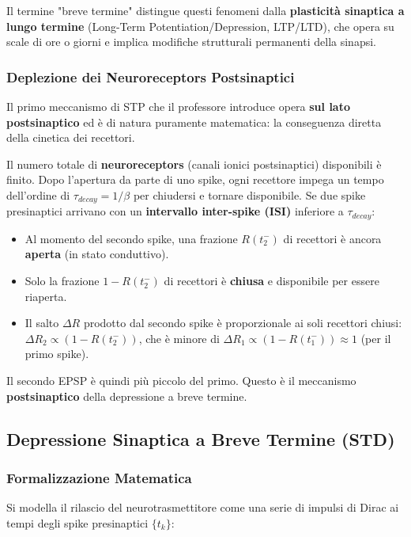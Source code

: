 Il termine "breve termine" distingue questi fenomeni dalla \textbf{plasticità sinaptica a lungo termine} (Long-Term Potentiation/Depression, LTP/LTD), che opera su scale di ore o giorni e implica modifiche strutturali permanenti della sinapsi.

\subsubsection{Deplezione dei Neuroreceptors Postsinaptici}

Il primo meccanismo di STP che il professore introduce opera \textbf{sul lato postsinaptico} ed è di natura puramente matematica: la conseguenza diretta della cinetica dei recettori.

Il numero totale di \textbf{neuroreceptors} (canali ionici postsinaptici) disponibili è finito. Dopo l'apertura da parte di uno spike, ogni recettore impega un tempo dell'ordine di $\tau_{decay} = 1/\beta$ per chiudersi e tornare disponibile. Se due spike presinaptici arrivano con un \textbf{intervallo inter-spike (ISI)} inferiore a $\tau_{decay}$:

\begin{itemize}
    \item Al momento del secondo spike, una frazione $R(t_2^-)$ di recettori è ancora \textbf{aperta} (in stato conduttivo).
    \item Solo la frazione $1 - R(t_2^-)$ di recettori è \textbf{chiusa} e disponibile per essere riaperta.
    \item Il salto $\Delta R$ prodotto dal secondo spike è proporzionale ai soli recettori chiusi: $\Delta R_2 \propto (1 - R(t_2^-))$, che è minore di $\Delta R_1 \propto (1 - R(t_1^-)) \approx 1$ (per il primo spike).
\end{itemize}

Il secondo EPSP è quindi più piccolo del primo. Questo è il meccanismo \textbf{postsinaptico} della depressione a breve termine.


\subsection{Depressione Sinaptica a Breve Termine (STD)}

\subsubsection{Formalizzazione Matematica}

Si modella il rilascio del neurotrasmettitore come una serie di impulsi di Dirac ai tempi degli spike presinaptici $\{t_k\}$:

